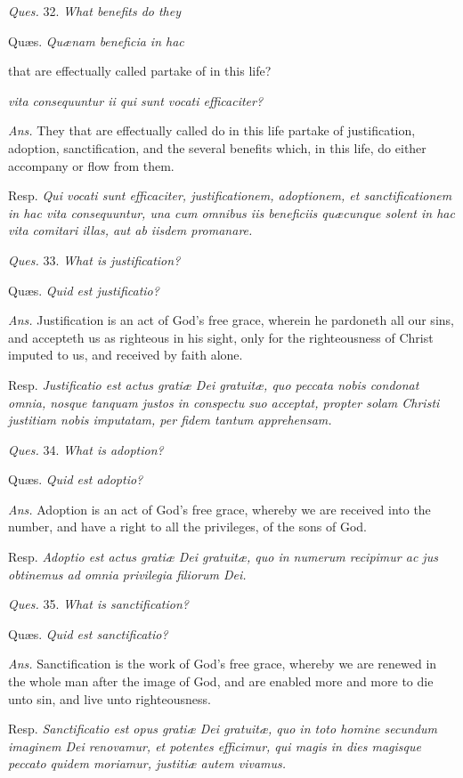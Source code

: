 \emph{Ques.} 32. \emph{What benefits do they }

Quæs. \emph{Quænam beneficia in hac }

that are effectually called partake of in this life?

\emph{vita consequuntur ii qui sunt vocati efficaciter?}

\emph{Ans.} They that are effectually called do in this life partake of justification, adoption, sanctification, and the several benefits which, in this life, do either accompany or flow from them.

Resp. \emph{Qui vocati sunt efficaciter, justificationem, adoptionem, et sanctificationem in hac vita consequuntur, una cum omnibus iis beneficiis quæcunque solent in hac vita comitari illas, aut ab iisdem promanare. }

\emph{Ques.} 33. \emph{What is justification?}

Quæs. \emph{Quid est justificatio?}

\emph{Ans.} Justification is an act of God's free grace, wherein he pardoneth all our sins, and accepteth us as righteous in his sight, only for the righteousness of Christ imputed to us, and received by faith alone.

Resp. \emph{Justificatio est actus gratiæ Dei gratuitæ, quo peccata nobis condonat omnia, nosque tanquam justos in conspectu suo acceptat, propter solam Christi justitiam nobis imputatam, per fidem tantum apprehensam.}

\emph{Ques.} 34. \emph{What is adoption?}

Quæs.\emph{ Quid est adoptio?}

\emph{Ans.} Adoption is an act of God's free grace, whereby we are received into the number, and have a right to all the privileges, of the sons of God.

Resp. \emph{Adoptio est actus gratiæ Dei gratuitæ, quo in numerum recipimur ac jus obtinemus ad omnia privilegia filiorum Dei.}

\emph{Ques.} 35. \emph{What is sanctification?}

Quæs. \emph{Quid est sanctificatio?}

\emph{Ans.} Sanctification is the work of God's free grace, whereby we are renewed in the whole man after the image of God, and are enabled more and more to die unto sin, and live unto righteousness.

Resp. \emph{Sanctificatio est opus gratiæ Dei gratuitæ, quo in toto homine secundum imaginem Dei renovamur, et potentes efficimur, qui magis in dies magisque peccato quidem moriamur, justitiæ autem vivamus.}

